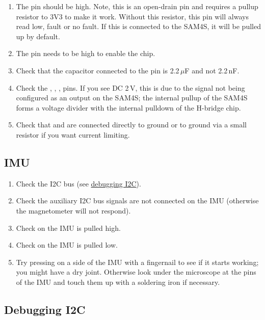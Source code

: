\begin{enumerate}
\item The  pin should be high.  Note, this is an
  open-drain pin and requires a pullup resistor to 3V3 to make it
  work.  Without this resistor, this pin will always read low, fault
  or no fault.  If this is connected to the SAM4S, it will be pulled
  up by default.

\item The  pin needs to be high to enable the chip.

\item Check that the capacitor connected to the  pin is
  2.2\,$\mu$F and not 2.2\,nF.

\item Check the , , ,  pins.
  If you see DC 2\,V, this is due to the signal not being configured
  as an output on the SAM4S; the internal pullup of the SAM4S forms a
  voltage divider with the internal pulldown of the H-bridge chip.

\item Check that  and  are connected
  directly to ground or to ground via a small resistor if you want
  current limiting.
\end{enumerate}


\subsection{IMU}
\label{imu}
\label{checking-IMU}

\begin{enumerate}
\item Check the I2C bus (see \hyperref[debugging-i2c]{debugging I2C}).
\item Check the auxiliary I2C bus signals are not connected on the IMU
  (otherwise the magnetometer will not respond).
\item Check  on the IMU is pulled high.
\item Check  on the IMU is pulled low.  
\item Try pressing on a side of the IMU with a fingernail to see if it
  starts working; you might have a dry joint.  Otherwise look under
  the microscope at the pins of the IMU and touch them up with a
  soldering iron if necessary.
\end{enumerate}



\subsection{Debugging I2C}
\label{debugging-i2c}

